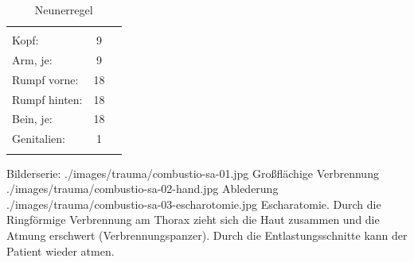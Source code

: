 \begin{table}[H]
\caption{Neunerregel}\label{tab:Neunerregel}
\begin{tabulary}{\linewidth}[H]{LCC}
\addlinespace\toprule\addlinespace
\noindent & \noindent\TabHeading{\PC} &\noindent 
\\\addlinespace\midrule\addlinespace
Kopf:
 & 9  &
\\
Arm, je:  &  9  &
\\
Rumpf vorne: & 18  &
\\
Rumpf hinten: & 18 &
\\
Bein, je: & 18 &
\\
Genitalien:  & 1 &
\\\addlinespace\bottomrule
\end{tabulary}
\end{table}


\begin{PictureSeriesWide}{}{Bilderserie: }
{./images/trauma/combustio-sa-01.jpg}
{Großflächige
Verbrennung }
{./images/trauma/combustio-sa-02-hand.jpg}
{Ablederung
}
{./images/trauma/combustio-sa-03-escharotomie.jpg}
{Escharatomie.  Durch die
Ringförmige Verbrennung am Thorax zieht sich die Haut
zusammen  und die Atmung erschwert (Verbrennungspanzer).
Durch die
{Entlastungsschnitte} kann der Patient wieder atmen.
}
{}
{}
\end{PictureSeriesWide}





